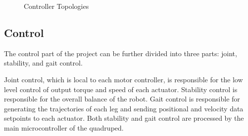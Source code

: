 \documentclass[english]{upeeei}
\begin{document}
\begin{figure}[H]
\begin{centering}
\par\end{centering}
\begin{centering}
\par\end{centering}
\caption{Controller Topologies\label{fig:controller-diagrams}}
\end{figure}

\subsection{Control}

The control part of the project can be further divided into three parts: joint, stability, and gait control.

Joint control, which is local to each motor controller, is responsible for the low level control of output torque and speed of each actuator. Stability control is responsible for the overall balance of the robot. Gait control is responsible for generating the trajectories of each leg and sending positional and velocity data setpoints to each actuator. Both stability and gait control are processed by the main microcontroller of the quadruped.
\end{document}
